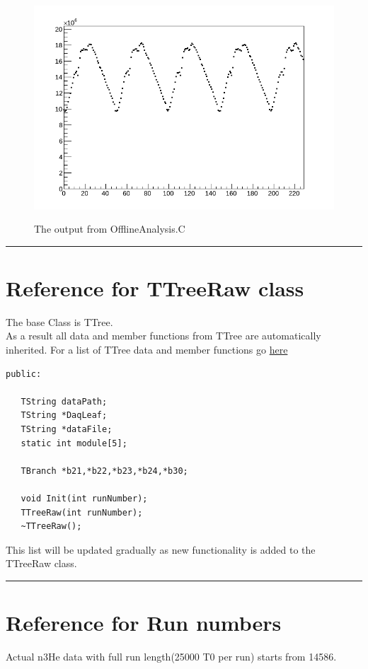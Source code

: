 \documentclass[12pt]{article}
\begin{document}
\begin{figure}[htb]
\centering
\includegraphics[width=6in]{OfflineAnalysis.png}\\
\caption{The output from OfflineAnalysis.C}\label{f6}
\end{figure}

\noindent
{\color{red} \rule{\linewidth}{1mm} }
 
\newpage
\section{Reference for TTreeRaw class}
The base Class is  TTree.\\
As a result all data and member functions from TTree are automatically inherited. For a list of TTree data and member functions go \href{https://root.cern.ch/root/html/TTree.html}{here}
\begin{lstlisting}
public:

   TString dataPath;
   TString *DaqLeaf;
   TString *dataFile;
   static int module[5];

   TBranch *b21,*b22,*b23,*b24,*b30;

   void Init(int runNumber);
   TTreeRaw(int runNumber);
   ~TTreeRaw();

\end{lstlisting}
This list will be updated gradually as new functionality is added to the TTreeRaw class.

\noindent
{\color{red} \rule{\linewidth}{1mm} }

\newpage
\section{Reference for Run numbers}
Actual n3He data with full run length(25000 T0 per run) starts from 14586. \\
\end{document}
